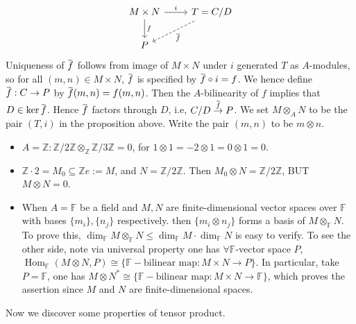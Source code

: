\documentclass[12pt]{article}
\theoremstyle{definition}
\theoremstyle{plain}
\DeclareMathOperator{\Hom}{Hom}
\newcommand{\z}{\mathbb{Z}}
\newcommand{\field}{\mathbb{F}}
\newcommand{\overbar}[1]{\mkern 1.5mu\overline{\mkern-1.5mu#1\mkern-1.5mu}\mkern 1.5mu}
\renewcommand{\bar}{\overbar}
\begin{document}
\begin{equation}
  \begin{tikzcd}
    M\times N\ar{r}{i}\ar{d}{f}& T=C/D\ar[dashed]{ld}{\bar{f}}\\
    P
  \end{tikzcd}
\end{equation}
Uniqueness of $\bar{f}$ follows from image of $M\times N$ under $i$ generated $T$ as $A$-modules, so for all $(m, n)\in M\times N$, $\bar{f}$ is specified by $\bar{f}\circ i=f$. We hence define $\bar{f}:C\to P$ by $\bar{f}(m, n)=f(m, n)$. Then the $A$-bilinearity of $f$ implies that $D\in \ker \bar{f}$. Hence $\bar{f}$ factors through $D$, i.e, $C/D\overset{\bar{f}}{\to} P$.
\Def We set $M\otimes_A N$ to be the pair $(T, i)$ in the proposition above. Write the pair $(m, n)$ to be $m\otimes n$.
\Exe \leavevmode
\begin{itemize}
  \item $A=\z: \z/2\z\otimes_{\z} \z/3\z=0$, for $1\otimes 1=-2\otimes 1=0\otimes 1=0$.
  \item $\z\cdot 2=M_0\subseteq \z e:=M$, and $N=\z/2\z$. Then $M_0\otimes N=\z/2\z$, BUT $M\otimes N=0$.
  \item When $A=\field$ be a field and $M, N$ are finite-dimensional vector spaces over $\field$ with bases $\{m_i\}, \{n_j\}$ respectively. then $\{m_i\otimes n_j\}$ forms a basis of $M\otimes_\field N$. To prove this, $\dim_\field M\otimes_\field N\leq \dim_\field M\cdot \dim_\field N$ is easy to verify. To see the other side, note via universal property one has $\forall \field$-vector space $P$, $\Hom_\field(M\otimes N, P)\cong \{\field-\text{bilinear map}:M\times N\to P\}$. In particular, take $P=\field$, one has $M\otimes N^*\cong \{\field-\text{bilinear map}:M\times N\to \field\}$, which proves the assertion since $M$ and $N$ are finite-dimensional spaces.
\end{itemize}
Now we discover some properties of tensor product.
\end{document}
